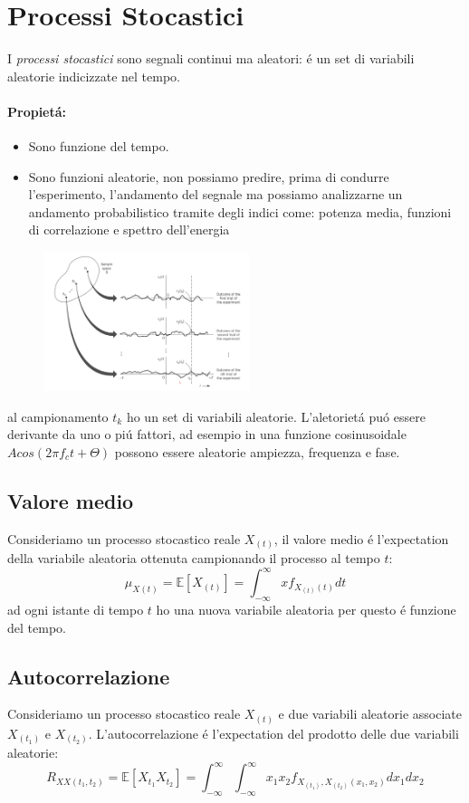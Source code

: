 \section{Processi Stocastici}
    I \emph{processi stocastici} sono segnali continui ma aleatori: é un set di variabili aleatorie indicizzate nel tempo.
    \paragraph{Propietá:}
        \begin{itemize}
            \item {Sono funzione del tempo.}
            \item {Sono funzioni aleatorie, non possiamo predire, prima di condurre l'esperimento, l'andamento del segnale ma 
            possiamo analizzarne un andamento probabilistico tramite degli indici come: potenza media, funzioni di correlazione e spettro dell'energia}
        \end{itemize} 
        \begin{figure}[H]
            \centering
            \includegraphics[width = 6cm]{media/processi stocastici.png}
        \end{figure}
        al campionamento $t_k$ ho un set di variabili aleatorie. L'aletorietá puó essere derivante da uno o piú fattori,
        ad esempio in una funzione cosinusoidale $Acos(2\pi f_ct+\Theta)$ possono essere aleatorie ampiezza, frequenza e fase.

    \subsection{Valore medio}
        Consideriamo un processo stocastico reale $X_{(t)}$, il valore medio é l'expectation della variabile aleatoria ottenuta campionando
        il processo al tempo $t$:
            \[
                \mu_{X(t)} = \mathbb{E}[X_{(t)}] = \int_{-\infty}^{\infty}xf_{X_{(t)}(t)}dt
            \]
        ad ogni istante di tempo $t$ ho una nuova variabile aleatoria per questo é funzione del tempo.
    \subsection{Autocorrelazione}
        Consideriamo un processo stocastico reale $X_{(t)}$ e due variabili aleatorie associate $X_{(t_1)}$ e $X_{(t_2)}$. 
        L'autocorrelazione é l'expectation del prodotto delle due variabili aleatorie:
        \[
            R_{XX(t_1,t_2)} = \mathbb{E}[X_{t_1}X_{t_2}] = \int_{-\infty}^{\infty}\int_{-\infty}^{\infty} x_1x_2f_{X_{(t_1)},X_{(t_2)}(x_1,x_2)}dx_1dx_2
        \]
